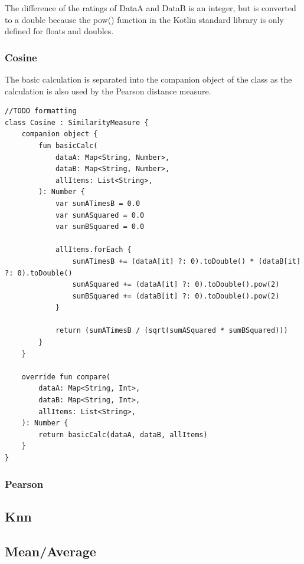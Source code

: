 The difference of the ratings of DataA and DataB is an integer, but is converted to a double because the pow() function in the Kotlin standard library is only defined for floats and doubles.

\subsubsection{Cosine}

The basic calculation is separated into the companion object of the class as the calculation is also used by the Pearson distance measure. 

\begin{verbatim}
//TODO formatting
class Cosine : SimilarityMeasure {
    companion object {
        fun basicCalc(
            dataA: Map<String, Number>,
            dataB: Map<String, Number>,
            allItems: List<String>,
        ): Number {
            var sumATimesB = 0.0
            var sumASquared = 0.0
            var sumBSquared = 0.0

            allItems.forEach {
                sumATimesB += (dataA[it] ?: 0).toDouble() * (dataB[it] ?: 0).toDouble()
                sumASquared += (dataA[it] ?: 0).toDouble().pow(2)
                sumBSquared += (dataB[it] ?: 0).toDouble().pow(2)
            }

            return (sumATimesB / (sqrt(sumASquared * sumBSquared)))
        }
    }

    override fun compare(
        dataA: Map<String, Int>,
        dataB: Map<String, Int>,
        allItems: List<String>,
    ): Number {
        return basicCalc(dataA, dataB, allItems)
    }
}
\end{verbatim}

\subsubsection{Pearson}

\subsection{Knn}

\subsection{Mean/Average}
